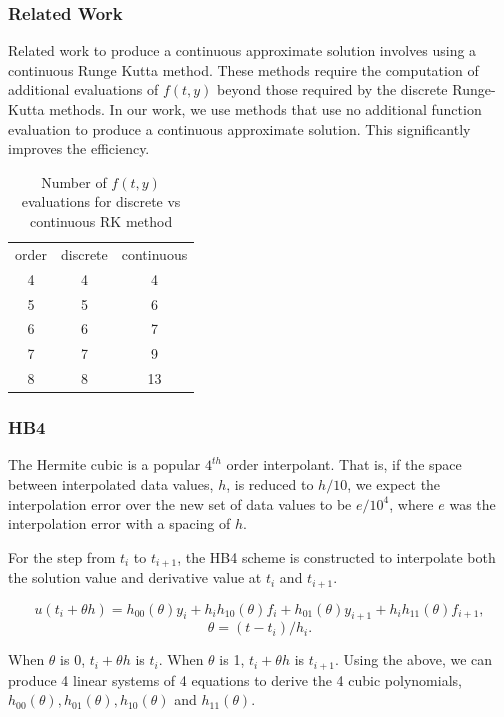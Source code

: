 \documentclass{beamer}
\begin{document}
\begin{frame}
\frametitle{Related Work}
Related work to produce a continuous approximate solution involves using a continuous Runge Kutta method. 
These methods require the computation of additional evaluations of $f(t, y)$ beyond those required by the discrete Runge-Kutta methods.
In our work, we use methods that use no additional function evaluation to produce a continuous approximate solution. This significantly improves the efficiency.
\begin{table}[h]
   \caption {Number of $f(t, y)$ evaluations for discrete vs continuous RK method} 
   \label{tab:crk_nstages}
   \begin{center}
   \begin{tabular}{ c c c } 
   order   & discrete & continuous \\ 
   4 & 4  & 4  \\ 
   5 & 5  & 6  \\ 
   6 & 6  & 7  \\ 
   7 & 7  & 9  \\ 
   8 & 8  & 13 \\ 
   \end{tabular}
   \end{center}
   \end{table}
\end{frame}

\begin{frame}
\frametitle{HB4}
The Hermite cubic is a popular $4^{th}$ order interpolant.
That is, if the space between interpolated data values, $h$, is reduced to $h/10$, we expect the interpolation error over the new set of data values to be $e/10^{4}$, where $e$ was the interpolation error with a spacing of $h$. 

For the step from $t_i$ to $t_{i + 1}$, the HB4 scheme is constructed to interpolate both the solution value and derivative value at $t_i$ and $t_{i + 1}$.

\begin{equation}
\label{eqn:HB4}
u(t_i + \theta h) = h_{00}(\theta)y_i +  h_ih_{10}(\theta)f_i + h_{01}(\theta)y_{i + 1} + h_ih_{11}(\theta)f_{i + 1}, 
\end{equation}
\begin{equation}
\label{eqn:HB4_theta}
\theta = (t - t_i) / h_i.
\end{equation}

When $\theta$ is 0, $t_i + \theta h$ is $t_i$.
When $\theta$ is 1, $t_i + \theta h$ is $t_{i + 1}$.
Using the above, we can produce 4 linear systems of 4 equations to derive the 4 cubic polynomials, $h_{00}(\theta), h_{01}(\theta), h_{10}(\theta)$ and $h_{11}(\theta)$.
\end{frame}
\end{document}
